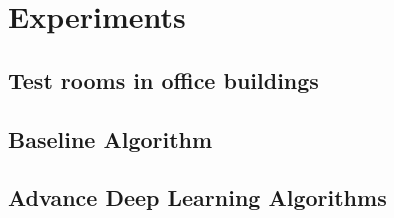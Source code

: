 \chapter{Experiments}
\label{chapter:methods}
\section{Test rooms in office buildings}

\section{Baseline Algorithm}
\label{section:environments}

\section{Advance Deep Learning Algorithms}
\label{section:environments}
